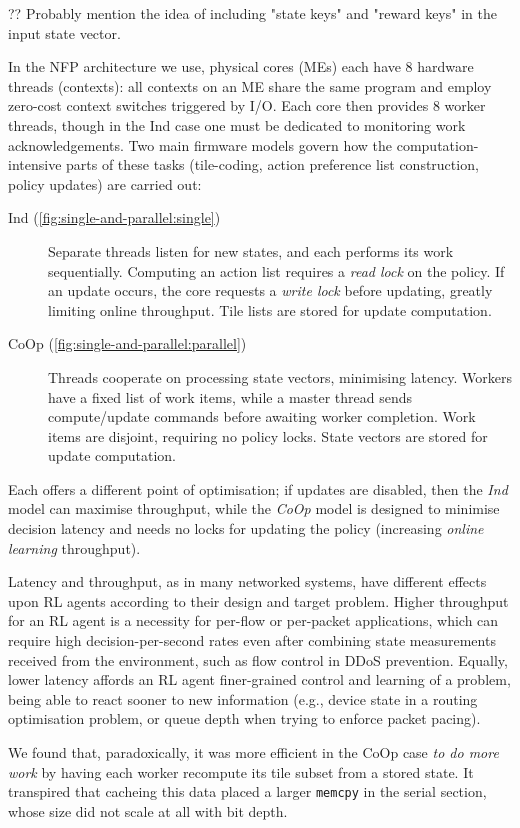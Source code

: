 \documentclass[sigconf,natbib=false]{acmart}
\newcommand{\Coopfw}{CoOp}
\newcommand{\coopfw}{\Coopfw}
\newcommand{\Indfw}{Ind}
\newcommand{\indfw}{\Indfw}
\begin{document}
?? Probably mention the idea of including "state keys" and "reward keys" in the input state vector.

In the NFP architecture we use, physical cores (MEs) each have 8 hardware threads (contexts): all contexts on an ME share the same program and employ zero-cost context switches triggered by I/O.
Each core then provides 8 worker threads, though in the \indfw{} case one must be dedicated to monitoring work acknowledgements.
Two main firmware models govern how the computation-intensive parts of these tasks (tile-coding, action preference list construction, policy updates) are carried out:
\begin{description}
	\item[\Indfw{} (\cref{fig:single-and-parallel:single})] Separate threads listen for new states, and each performs its work sequentially. Computing an action list requires a \emph{read lock} on the policy. If an update occurs, the core requests a \emph{write lock} before updating, greatly limiting online throughput. Tile lists are stored for update computation.
	\item[\Coopfw{} (\cref{fig:single-and-parallel:parallel})] Threads cooperate on processing state vectors, minimising latency. Workers have a fixed list of work items, while a master thread sends compute/update commands before awaiting worker completion. Work items are disjoint, requiring no policy locks. State vectors are stored for update computation.
\end{description}
Each offers a different point of optimisation; if updates are disabled, then the \emph{\indfw{}} model can maximise throughput, while the \emph{\coopfw{}} model is designed to minimise decision latency and needs no locks for updating the policy (increasing \emph{online learning} throughput).

Latency and throughput, as in many networked systems, have different effects upon RL agents according to their design and target problem.
Higher throughput for an RL agent is a necessity for per-flow or per-packet applications, which can require high decision-per-second rates even after combining state measurements received from the environment, such as flow control in DDoS prevention.
Equally, lower latency affords an RL agent finer-grained control and learning of a problem, being able to react sooner to new information (e.g., device state in a routing optimisation problem, or queue depth when trying to enforce packet pacing).

We found that, paradoxically, it was more efficient in the \Coopfw{} case \emph{to do more work} by having each worker recompute its tile subset from a stored state.
It transpired that cacheing this data placed a larger \texttt{memcpy} in the serial section, whose size did not scale at all with bit depth.
\end{document}
